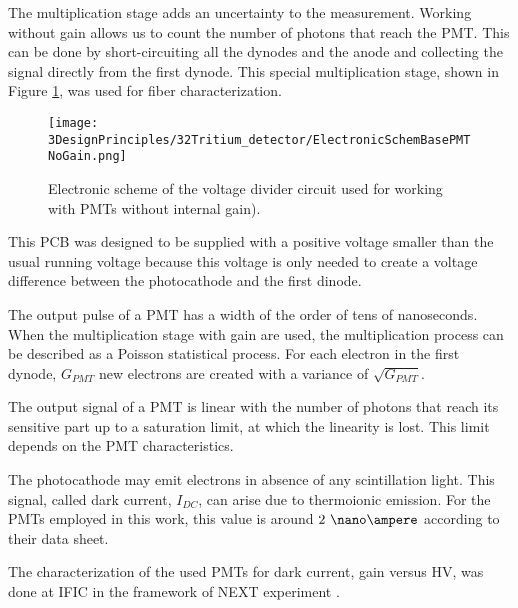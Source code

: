 \begin{enumerate}
The multiplication stage adds an uncertainty to the measurement. Working without gain allows us to count the number of photons that reach the PMT. This can be done by short-circuiting all the dynodes and the anode and collecting the signal directly from the first dynode. This special multiplication stage, shown in Figure \ref{fig:ElectronicSchemeBasePMTNoGain}, was used for fiber characterization.

\begin{figure}[htbp]
\centering
\texttt{[image: 3DesignPrinciples/32Tritium\_detector/ElectronicSchemBasePMTNoGain.png]}
\caption{Electronic scheme of the voltage divider circuit used for working with PMTs without internal gain).\label{fig:ElectronicSchemeBasePMTNoGain}}
\end{figure}

This PCB was designed to be supplied with a positive voltage smaller than the usual running voltage because this voltage is only needed to create a voltage difference between the photocathode and the first dinode. 

\end{enumerate}

The output pulse of a PMT has a width of the order of tens of nanoseconds. When the multiplication stage with gain are used, the multiplication process can be described as a Poisson statistical process. For each electron in the first dynode, $G_{PMT}$ new electrons are created with a variance of $\sqrt{G_{PMT}}$.

The output signal of a PMT is linear with the number of photons that reach its sensitive part up to a saturation limit, at which the linearity is lost. This limit depends on the PMT characteristics.

The photocathode may emit electrons in absence of any scintillation light. This signal, called dark current, $I_{DC}$, can  arise due to thermoionic emission. For the PMTs employed in this work, this value is around $2~\nano\ampere$ according to their data sheet.

The characterization of the used PMTs for dark current, gain versus HV, was done at IFIC in the framework of NEXT experiment \cite{CalibrationPMTsNEXT}. 